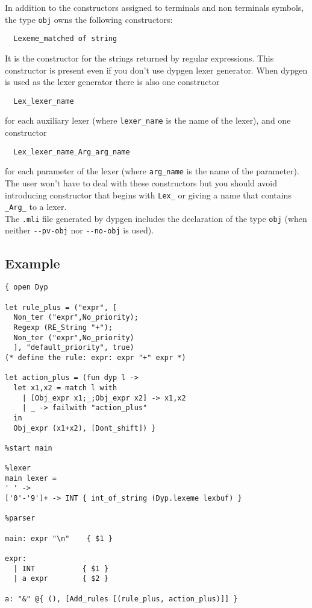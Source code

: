 \documentclass[12pt]{article}
\begin{document}
{In addition to the constructors assigned to terminals and non terminals symbols, the type \verb|obj| owns the following constructors:
\begin{verbatim}
  Lexeme_matched of string
\end{verbatim}
It is the constructor for the strings returned by regular expressions.
This constructor is present even if you don't use dypgen lexer generator.
When dypgen is used as the lexer generator there is also one constructor
\begin{verbatim}
  Lex_lexer_name
\end{verbatim}
for each auxiliary lexer (where \verb|lexer_name| is the name of the lexer), and one constructor
\begin{verbatim}
  Lex_lexer_name_Arg_arg_name
\end{verbatim}
for each parameter of the lexer (where \verb|arg_name| is the name of the
parameter). The user won't have to deal with these constructors but you should avoid introducing constructor that begins with \verb|Lex_| or giving a name that contains \verb|_Arg_| to a lexer.\\

The \verb|.mli| file generated by dypgen includes the declaration of the type \verb|obj| (when neither \verb|--pv-obj| nor \verb|--no-obj| is used).

\subsection{Example}\label{example}
\begin{verbatim}
{ open Dyp

let rule_plus = ("expr", [
  Non_ter ("expr",No_priority);
  Regexp (RE_String "+");
  Non_ter ("expr",No_priority)
  ], "default_priority", true)
(* define the rule: expr: expr "+" expr *)

let action_plus = (fun dyp l ->
  let x1,x2 = match l with
    | [Obj_expr x1;_;Obj_expr x2] -> x1,x2
    | _ -> failwith "action_plus"
  in
  Obj_expr (x1+x2), [Dont_shift]) }

%start main

%lexer
main lexer =
' ' ->
['0'-'9']+ -> INT { int_of_string (Dyp.lexeme lexbuf) }

%parser

main: expr "\n"    { $1 }

expr:
  | INT           { $1 }
  | a expr        { $2 }

a: "&" @{ (), [Add_rules [(rule_plus, action_plus)]] }
\end{verbatim}

}
\end{document}
